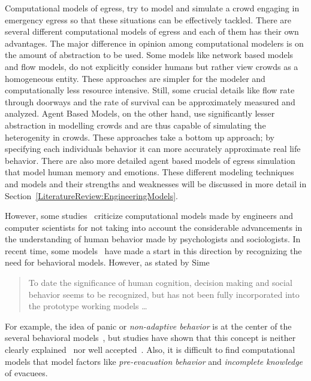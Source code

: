 Computational models of egress, try to model and simulate a crowd engaging in emergency egress so that these situations can be effectively tackled. There are several different computational models of egress and each of them has their own advantages. The major difference in opinion among computational modelers is on the amount of abstraction to be used. Some models like network based models and flow models, do not explicitly consider humans but rather view crowds as a homogeneous entity. These approaches are simpler for the modeler and computationally less resource intensive. Still, some crucial details like flow rate through doorways and the rate of survival can be approximately measured and analyzed. Agent Based Models, on the other hand, use significantly lesser abstraction in modelling crowds and are thus capable of simulating the heterogenity in crowds. These approaches take a bottom up approach; by specifying each individuals behavior it can more accurately approximate real life behavior. There are also more detailed agent based models of egress simulation that model human memory and emotions. These different modeling techniques and models and their strengths and weaknesses will be discussed in more detail in Section~\ref{LiteratureReview:EngineeringModels}.

However, some studies~\cite{Torres:2010tj,Sime:1995uu,Aguirre:2004tn} criticize computational models made by engineers and computer scientists for not taking into account the considerable advancements in the understanding of human behavior made by psychologists and sociologists. In recent time, some models~\cite{Pan:2006vp} have made a start in this direction by recognizing the need for behavioral models. However, as stated by Sime~\cite{Sime:1995uu}
\begin{quote}
To date the significance of human cognition, decision making and social behavior seems to be recognized, but has not been fully incorporated into the prototype working models \ldots
\end{quote}
For example, the idea of panic or \emph{non-adaptive behavior} is at the center of the several behavioral models~\cite{Pan:2006vp,Franca:2009wq}, but studies have shown that this concept is neither clearly explained~\cite{Torres:2010tj} nor well accepted~\cite{Cocking:2005uc,Paulsen:1984ti,Proulx:2001we,Ramachandran:1990wj,Sandberg:1997tw,Sime:1995uu}. Also, it is difficult to find computational models that model factors like \emph{pre-evacuation behavior} and \emph{incomplete knowledge} of evacuees.

